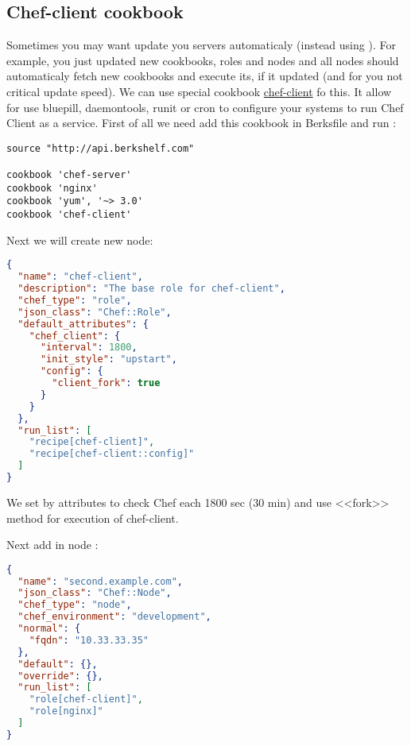 \subsection{Chef-client cookbook}

Sometimes you may want update you servers automaticaly (instead using ). For example, you just updated new cookbooks, roles and nodes and all nodes should automaticaly fetch new cookbooks and execute its, if it updated (and for you not critical update speed). We can use special cookbook \href{http://community.opscode.com/cookbooks/chef-client}{chef-client} fo this. It allow for use bluepill, daemontools, runit or cron to configure your systems to run Chef Client as a service. First of all we need add this cookbook in Berksfile and run :

\begin{lstlisting}[label=lst:my-server-cloud-knife-ssh6,title=my-server-cloud/Berksfile]
source "http://api.berkshelf.com"

cookbook 'chef-server'
cookbook 'nginx'
cookbook 'yum', '~> 3.0'
cookbook 'chef-client'
\end{lstlisting}

Next we will create new node:

\begin{lstlisting}[language=JSON,label=lst:my-server-cloud-knife-ssh7,title=my-server-cloud/roles/chef-client.json]
{
  "name": "chef-client",
  "description": "The base role for chef-client",
  "chef_type": "role",
  "json_class": "Chef::Role",
  "default_attributes": {
    "chef_client": {
      "interval": 1800,
      "init_style": "upstart",
      "config": {
        "client_fork": true
      }
    }
  },
  "run_list": [
    "recipe[chef-client]",
    "recipe[chef-client::config]"
  ]
}
\end{lstlisting}

We set by attributes to check Chef each 1800 sec (30 min) and use <<fork>> method for execution of chef-client.

Next add  in node :

\begin{lstlisting}[language=JSON,label=lst:my-server-cloud-knife-ssh8,title=my-server-cloud/nodes/second.example.com.json]
{
  "name": "second.example.com",
  "json_class": "Chef::Node",
  "chef_type": "node",
  "chef_environment": "development",
  "normal": {
    "fqdn": "10.33.33.35"
  },
  "default": {},
  "override": {},
  "run_list": [
    "role[chef-client]",
    "role[nginx]"
  ]
}
\end{lstlisting}

